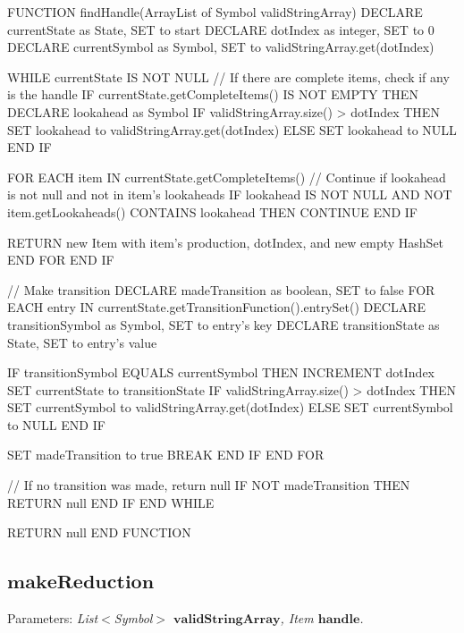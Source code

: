 \begin{codeblock}
    FUNCTION findHandle(ArrayList of Symbol validStringArray)
    DECLARE currentState as State, SET to start
    DECLARE dotIndex as integer, SET to 0
    DECLARE currentSymbol as Symbol, SET to validStringArray.get(dotIndex)

    WHILE currentState IS NOT NULL
    // If there are complete items, check if any is the handle
    IF currentState.getCompleteItems() IS NOT EMPTY THEN
    DECLARE lookahead as Symbol
    IF validStringArray.size() > dotIndex THEN
    SET lookahead to validStringArray.get(dotIndex)
    ELSE
    SET lookahead to NULL
    END IF

    FOR EACH item IN currentState.getCompleteItems()
    // Continue if lookahead is not null and not in item's lookaheads
    IF lookahead IS NOT NULL AND NOT item.getLookaheads() CONTAINS lookahead THEN
    CONTINUE
    END IF

    RETURN new Item with item's production, dotIndex, and new empty HashSet
    END FOR
    END IF

    // Make transition
    DECLARE madeTransition as boolean, SET to false
    FOR EACH entry IN currentState.getTransitionFunction().entrySet()
    DECLARE transitionSymbol as Symbol, SET to entry's key
    DECLARE transitionState as State, SET to entry's value

    IF transitionSymbol EQUALS currentSymbol THEN
    INCREMENT dotIndex
    SET currentState to transitionState
    IF validStringArray.size() > dotIndex THEN
    SET currentSymbol to validStringArray.get(dotIndex)
    ELSE
    SET currentSymbol to NULL
    END IF

    SET madeTransition to true
    BREAK
    END IF
    END FOR

    // If no transition was made, return null
    IF NOT madeTransition THEN
    RETURN null
    END IF
    END WHILE

    RETURN null
    END FUNCTION

\end{codeblock}

\vspace{20pt}

\subsection{\(\boldsymbol{makeReduction}\)}

Parameters: \textit{List\(<\)Symbol\(>\) \(\boldsymbol{validStringArray}\), Item \(\boldsymbol{handle}\).}

